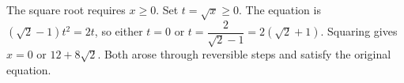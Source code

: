 The square root requires $x\ge0$. Set $t=\sqrt x\ge0$. The equation is $(\sqrt2-1)t^2=2t$, so either $t=0$ or $t=\dfrac{2}{\sqrt2-1}=2(\sqrt2+1)$. Squaring gives $\boxed{x=0\text{ or }12+8\sqrt2}$. Both arose through reversible steps and satisfy the original equation.
